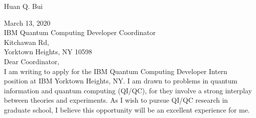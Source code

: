 \documentclass[10pt]{article}
\begin{document}
	

\noindent  





\begin{center}
	\Huge{Huan Q. Bui} 
\end{center}
\vspace{-7pt}
\begin{center}
\end{center}








	
%	




\noindent March 13, 2020\\
\noindent IBM Quantum Computing Developer Coordinator\\
 Kitchawan Rd, \\
\noindent Yorktown Heights, NY 10598\\






\noindent Dear Coordinator, \\


\noindent I am writing to apply for the IBM Quantum Computing Developer Intern position at IBM Yorktown Heights, NY. I am drawn to problems in quantum information and quantum computing (QI/QC), for they involve a strong interplay between theories and experiments. As I wish to pursue QI/QC research in graduate school, I believe this opportunity will be an excellent experience for me.\\ 
\end{document}
